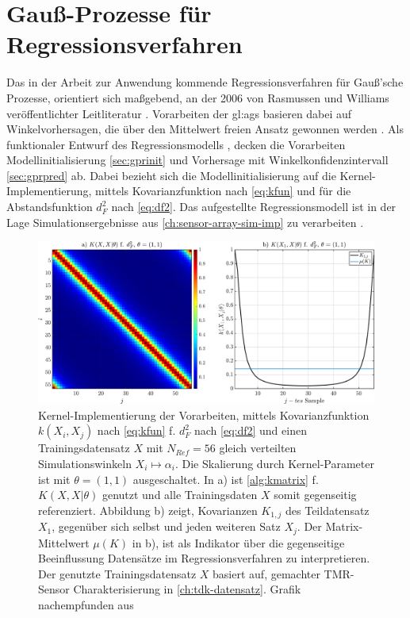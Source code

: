 
\section{Gauß-Prozesse für Regressionsverfahren}\label{sec:gauss-prozesse-regressionsverfahren}


Das in der Arbeit zur Anwendung kommende Regressionsverfahren für Gauß'sche Prozesse, orientiert sich maßgebend, an der 2006 von Rasmussen und Williams veröffentlichter Leitliteratur \cite{Rasmussen2006}.
Vorarbeiten der \gls{gl:ags} \cite{Schuethe2020b}\cite{Schuethe2020} basieren dabei auf Winkelvorhersagen, die über den Mittelwert freien Ansatz gewonnen werden \cite{Rasmussen2006}.
Als funktionaler Entwurf des Regressionsmodells \cite{Schuethe2020}, decken die Vorarbeiten Modellinitialisierung \autoref{sec:gprinit} und Vorhersage mit Winkelkonfidenzintervall \autoref{sec:gprpred} ab. Dabei bezieht sich die Modellinitialisierung auf die Kernel-Implementierung, mittels Kovarianzfunktion nach \autoref{eq:kfun} und für die Abstandsfunktion $d_F^2$ nach \autoref{eq:df2}. Das aufgestellte Regressionsmodell ist in der Lage Simulationsergebnisse aus \autoref{ch:sensor-array-sim-imp} zu verarbeiten \cite{Schuethe2020b}\cite{Schuethe2020}. 


\vspace{2mm}
\begin{figure}[bph]
	\centering
	\includegraphics[width=\linewidth]{chapters/images/2-Grundlagen/Kernel-Vorabeiten-N56}
	\caption[Kernel-Implementierung der Vorarbeiten]{Kernel-Implementierung der Vorarbeiten, mittels Kovarianzfunktion $k(X_i,X_j)$ nach \autoref{eq:kfun} f. $d_F^2$ nach \autoref{eq:df2} und einen Trainingsdatensatz $X$ mit $N_{Ref} = 56$ gleich verteilten Simulationswinkeln $X_i \mapsto \alpha_i$. Die Skalierung durch Kernel-Parameter ist mit $\theta = (1,1)$ ausgeschaltet. In a) ist \autoref{alg:kmatrix} f. $K(X,X|\theta)$ genutzt und alle Trainingsdaten $X$ somit gegenseitig referenziert. Abbildung b) zeigt, Kovarianzen $K_{1,j}$ des Teildatensatz $X_1$, gegenüber sich selbst und jeden weiteren Satz $X_j$. Der Matrix-Mittelwert $\mu(K)$ in b), ist als Indikator über die gegenseitige Beeinflussung Datensätze im Regressionsverfahren zu interpretieren. Der genutzte Trainingsdatensatz $X$ basiert auf, gemachter TMR-Sensor \cite{TDK2016} Charakterisierung in \autoref{ch:tdk-datensatz}. Grafik nachempfunden aus \cite{Lang2014}}
	\label{fig:kernel-vorabeiten-n56}
\end{figure}


